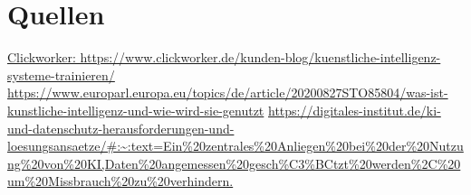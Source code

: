 \documentclass{report}
\begin{document}
\section{Quellen}
\url {Clickworker: https://www.clickworker.de/kunden-blog/kuenstliche-intelligenz-systeme-trainieren/}
\url {https://www.europarl.europa.eu/topics/de/article/20200827STO85804/was-ist-kunstliche-intelligenz-und-wie-wird-sie-genutzt}
\url{https://digitales-institut.de/ki-und-datenschutz-herausforderungen-und-loesungsansaetze/#:~:text=Ein%20zentrales%20Anliegen%20bei%20der%20Nutzung%20von%20KI,Daten%20angemessen%20gesch%C3%BCtzt%20werden%2C%20um%20Missbrauch%20zu%20verhindern.}
\end{document}
